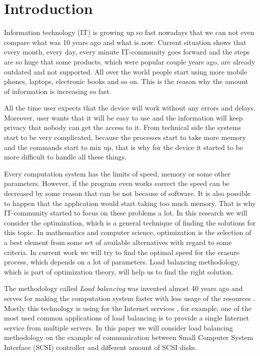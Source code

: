 \chapter{Introduction}
\label{chap1:title}

Information technology (IT) is growing up so fast nowadays that we can not even compare what was 10 years ago and what is now. Current situation shows that every month, every day, every minute IT-community goes forward and the steps are so huge that some products, which were popular couple years ago, are already outdated and not supported. All over the world people start using more mobile phones, laptops, electronic books and so on. This is the reason why the amount of information is increasing so fast. 

All the time user expects that the device will work without any errors and delays. Moreover, user wants that it will be easy to use and the information will keep privacy that nobody can get the access to it. From technical side the systems start to be very complicated, because the processes start to take more memory and the commands start to mix up, that is why for the device it started to be more difficult to handle all these things. 

Every computation system has the limits of speed, memory or some other parameters. However, if the program even works correct the speed can be decreased by some reason that can be not because of software. It is also possible to happen that the application would start taking too much memory. That is why IT-community started to focus on these problems a lot. In this research we will consider the optimization, which is a general technique of finding the solutions for this topic. In mathematics and computer science, optimization is the selection of a best element from some set of available alternatives with regard to some criteria. In current work we will try to find the optimal speed for the erasure process, which depends on a lot of parameters. Load balancing methodology, which is part of optimization theory, will help us to find the right solution.

The methodology called \emph{Load balancing} was invented almost 40 years ago and serves for making the computation system faster with less usage of the resources \cite{load_bal}. Mostly this technology is using for the Internet services \cite{dyn_bal_web}, for example, one of the most used common applications of load balancing is to provide a single Internet service from multiple servers. In this paper we will consider load balancing methodology on the example of communication between Small Computer System Interface (SCSI) controller and different amount of SCSI disks. 

